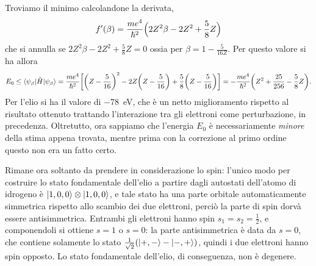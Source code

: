 Troviamo il minimo calcolandone la derivata,
\begin{equation}
    f'(\beta)=\frac{me^4}{\hbar^2}\Bigl(2Z^2\beta-2Z^2+\frac58Z\Bigr)
\end{equation}
che si annulla se $2Z^2\beta-2Z^2+\frac58Z=0$ ossia per $\beta=1-\frac5{16Z}$.
Per questo valore si ha allora
\begin{equation}
    E_0\le
    \langle\psi_\beta\rvert\hat{H}\lvert\psi_\beta\rangle=
    \frac{me^4}{\hbar^2}\biggl[\bigg(Z-\frac5{16}\bigg)^2-2Z\biggl(Z-\frac5{16}\biggr)+\frac58\bigg(Z-\frac5{16}\biggr)\biggr]=
    -\frac{me^4}{\hbar^2}\biggl(Z^2+\frac{25}{256}-\frac58Z\biggr).
\end{equation}
Per l'elio si ha il valore di \SI{-78}{\electronvolt}, che è un netto miglioramento rispetto al risultato ottenuto trattando l'interazione tra gli elettroni come perturbazione, in precedenza.
Oltretutto, ora sappiamo che l'energia $E_0$ è necessariamente \emph{minore} della stima appena trovata, mentre prima con la correzione al primo ordine questo non era un fatto certo.

Rimane ora soltanto da prendere in considerazione lo spin: l'unico modo per costruire lo stato fondamentale dell'elio a partire dagli autostati dell'atomo di idrogeno è $\lvert1,0,0\rangle\otimes\lvert1,0,0\rangle$, e tale stato ha una parte orbitale automaticamente simmetrica rispetto allo scambio dei due elettroni, perciò la parte di spin dorvà essere antisimmetrica.
Entrambi gli elettroni hanno spin $s_1=s_2=\frac12$, e componendoli si ottiene $s=1$ o $s=0$: la parte antisimmetrica è data da $s=0$, che contiene solamente lo stato $\frac1{\sqrt{2}}(\lvert+,-\rangle-\lvert-,+\rangle)$, quindi i due elettroni hanno spin opposto.
Lo stato fondamentale dell'elio, di conseguenza, non è degenere.


